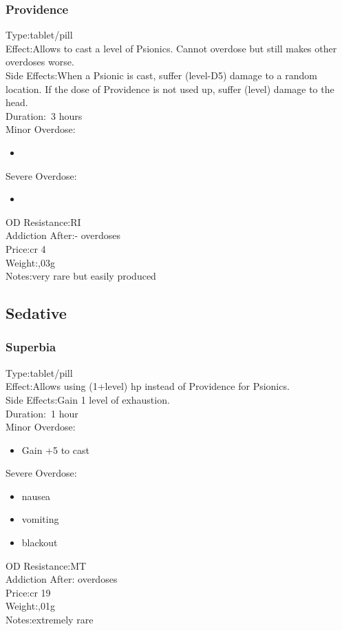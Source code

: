 \documentclass[12pt,a4paper,openany]{book}
\begin{document}
	\subsubsection{Providence} %
	Type:\tab tablet/pill\\
	Effect:\tab Allows to cast a level of Psionics. Cannot overdose but still makes other overdoses worse.\\
	Side Effects:\tab When a Psionic is cast, suffer (level-D5) damage to a random location.
	If the dose of Providence is not used up, suffer (level) damage to the head.\\
	Duration:\tab ~3 hours\\
	Minor Overdose:\\
	\begin{itemize}
		\setlength\itemsep{-8mm}
		\vspace{-12mm}
		\item 
	\end{itemize}
	Severe Overdose:\\
	\begin{itemize}
		\setlength\itemsep{-8mm}
		\vspace{-12mm}
		\item 
	\end{itemize}
	OD Resistance:\tab RI\\
	Addiction After:\tab - overdoses\\
	Price:\tab cr 4\\
	Weight:,03g\\
	Notes:\tab very rare but easily produced
	\subsection{Sedative}
	\subsubsection{Superbia} %
	Type:\tab tablet/pill\\
	Effect:\tab Allows using (1+level) hp instead of Providence for Psionics.\\
	Side Effects:\tab Gain 1 level of exhaustion.\\
	Duration:\tab ~1 hour\\
	Minor Overdose:\\
	\begin{itemize}
		\setlength\itemsep{-8mm}
		\vspace{-12mm}
		\item Gain +5 to cast
	\end{itemize}
	Severe Overdose:\\
	\begin{itemize}
		\setlength\itemsep{-8mm}
		\vspace{-12mm}
		\item nausea
		\item vomiting
		\item blackout
	\end{itemize}
	OD Resistance:\tab MT\\
	Addiction After: overdoses\\
	Price:\tab cr 19\\
	Weight:,01g\\
	Notes:\tab extremely rare
	
\end{document}
